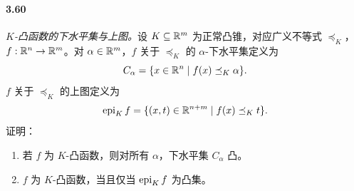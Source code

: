 \paragraph{3.60}\textit{$K$-凸函数的下水平集与上图。}设 $K\subseteq\mathbb R^m$ 为正常凸锥，对应广义不等式 $\preceq_K$，$f:\mathbb R^n\to\mathbb R^m$。对 $\alpha\in\mathbb R^m$，$f$ 关于 $\preceq_K$ 的 $\alpha$-下水平集定义为
\[C_\alpha=\{x\in\mathbb R^n\mid f(x)\preceq_K\alpha\}.\]
$f$ 关于 $\preceq_K$ 的上图定义为
\[\operatorname{epi}_K f=\{(x,t)\in\mathbb R^{n+m}\mid f(x)\preceq_K t\}.\]
证明：
\begin{enumerate}[label=(\alph*)]
\item 若 $f$ 为 $K$-凸函数，则对所有 $\alpha$，下水平集 $C_\alpha$ 凸。
\item $f$ 为 $K$-凸函数，当且仅当 $\operatorname{epi}_K f$ 为凸集。
\end{enumerate}
